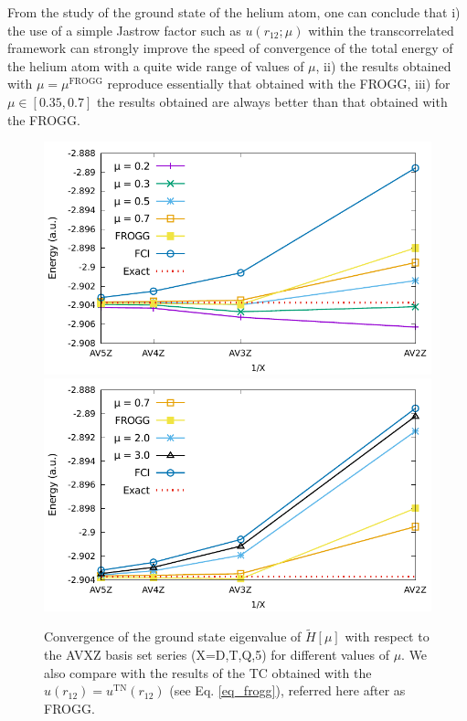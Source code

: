 \documentclass[aip,jcp,reprint,noshowkeys,superscriptaddress,twocolumn]{revtex4-1}
\newcommand{\mfrogg}[0]{\mu^\text{FROGG}}
\begin{document}
From the study of the ground state of the helium atom, one can conclude that i) the use of a simple Jastrow factor such as $u(r_{12};\mu)$ within the transcorrelated framework can strongly improve the speed of convergence of the total energy of the helium atom with a quite wide range of values of $\mu$, 
ii) the results obtained with $\mu=\mfrogg$ reproduce essentially that obtained with the FROGG, 
iii) for $\mu \in[ 0.35,0.7]$ the results obtained are always better than that obtained with the FROGG. 
\begin{figure}
        \includegraphics[width=0.45\linewidth]{plots/He/Energy/He_E_conv_basis_small_mu.pdf}
        \includegraphics[width=0.45\linewidth]{plots/He/Energy/He_E_conv_basis_large_mu.pdf}\\
        \caption{Convergence of the ground state eigenvalue of $\tilde{H}[\mu]$ with respect to the AVXZ basis set series (X=D,T,Q,5) for different values of $\mu$. 
We also compare with the results of the TC obtained with the $u(r_{12}) = u^{\text{TN}}(r_{12})$ (see Eq. \eqref{eq_frogg}), referred here after as FROGG. }
 \label{fig_conv_e_mu}
\end{figure}
\end{document}
